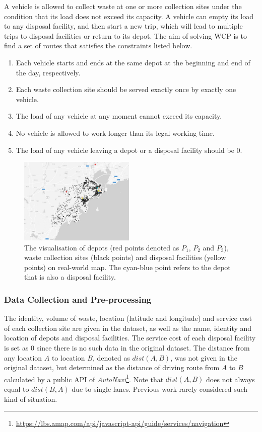 \documentclass[journal]{IEEEtran}
\begin{document}
A vehicle is allowed to collect waste at one or more collection sites under the condition that its load does not exceed its capacity. A vehicle can empty its load to any disposal facility, and then start a new trip, which will lead to multiple trips to disposal facilities or return to its depot. The aim of solving WCP is to find a set of routes that satisfies the constraints listed below.
\begin{enumerate}[label=$\mathcal{C}_\arabic*$:]
    \item Each vehicle starts and ends at the same depot at the beginning and end of the day, respectively.
    \item Each waste collection site should be served exactly once by exactly one vehicle.
    \item The load of any vehicle at any moment cannot exceed its capacity.
    \item No vehicle is allowed to work longer than its legal working time.
    \item The load of any vehicle leaving a depot or a disposal facility should be $0$.
\end{enumerate}

\begin{figure}[htbp]
\centering
	\includegraphics[width=0.49\textwidth]{dataset_new.png}
	\caption{\label{fig:dataset}
	The visualisation of depots (red points denoted as $P_1$, $P_2$ and $P_3$), waste collection sites (black points) and disposal facilities (yellow points) on real-world map. The cyan-blue point refers to the depot that is also a disposal facility.}
\end{figure}

\subsubsection{Data Collection and Pre-processing}\label{sec:data}
The identity, volume of waste, location (latitude and longitude) and service cost of each collection site are given in the dataset, as well as the name, identity and location of depots and disposal facilities. The service cost of each disposal facility is set as $0$ since there is no such data in the original dataset. The distance from any location $A$ to location $B$, denoted as $dist(A,B)$, was not given in the original dataset, but determined as the distance of driving route from $A$ to $B$ calculated by a public API of \emph{AutoNavi}\footnote{\url{https://lbs.amap.com/api/javascript-api/guide/services/navigation}}. Note that $dist(A,B)$ does not always equal to $dist(B,A)$ due to single lanes. Previous work rarely considered such kind of situation.
\end{document}
